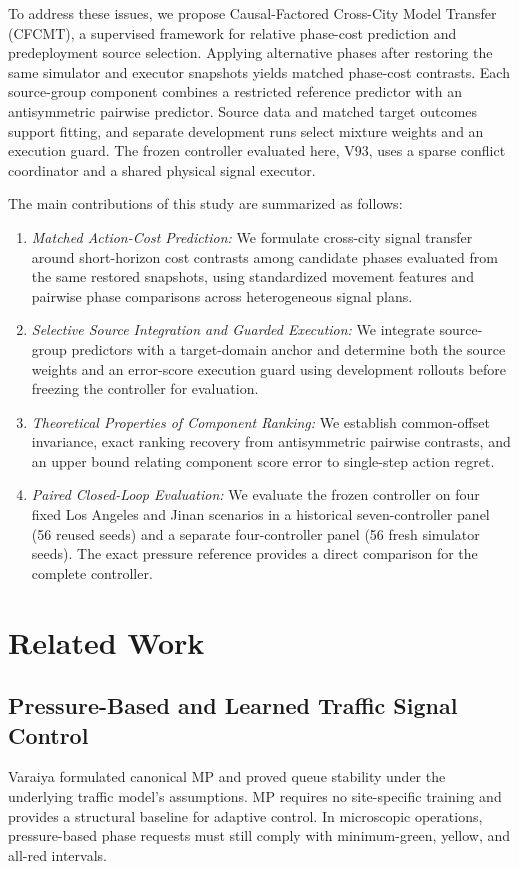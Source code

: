 \documentclass[letterpaper,journal]{IEEEtran}
\begin{document}
To address these issues, we propose Causal-Factored Cross-City Model Transfer (CFCMT), a supervised framework for relative phase-cost prediction and predeployment source selection. Applying alternative phases after restoring the same simulator and executor snapshots yields matched phase-cost contrasts. Each source-group component combines a restricted reference predictor with an antisymmetric pairwise predictor. Source data and matched target outcomes support fitting, and separate development runs select mixture weights and an execution guard. The frozen controller evaluated here, V93, uses a sparse conflict coordinator and a shared physical signal executor.

The main contributions of this study are summarized as follows:
\begin{enumerate}
    \item \textit{Matched Action-Cost Prediction:} We formulate cross-city signal transfer around short-horizon cost contrasts among candidate phases evaluated from the same restored snapshots, using standardized movement features and pairwise phase comparisons across heterogeneous signal plans.
    \item \textit{Selective Source Integration and Guarded Execution:} We integrate source-group predictors with a target-domain anchor and determine both the source weights and an error-score execution guard using development rollouts before freezing the controller for evaluation.
    \item \textit{Theoretical Properties of Component Ranking:} We establish common-offset invariance, exact ranking recovery from antisymmetric pairwise contrasts, and an upper bound relating component score error to single-step action regret.
    \item \textit{Paired Closed-Loop Evaluation:} We evaluate the frozen controller on four fixed Los Angeles and Jinan scenarios in a historical seven-controller panel (56 reused seeds) and a separate four-controller panel (56 fresh simulator seeds). The exact pressure reference provides a direct comparison for the complete controller.
\end{enumerate}

\section{Related Work}
\label{sec:related}

\subsection{Pressure-Based and Learned Traffic Signal Control}
Varaiya \cite{varaiya2013maxpressure} formulated canonical MP and proved queue stability under the underlying traffic model's assumptions. MP requires no site-specific training and provides a structural baseline for adaptive control. In microscopic operations, pressure-based phase requests must still comply with minimum-green, yellow, and all-red intervals.
\end{document}
